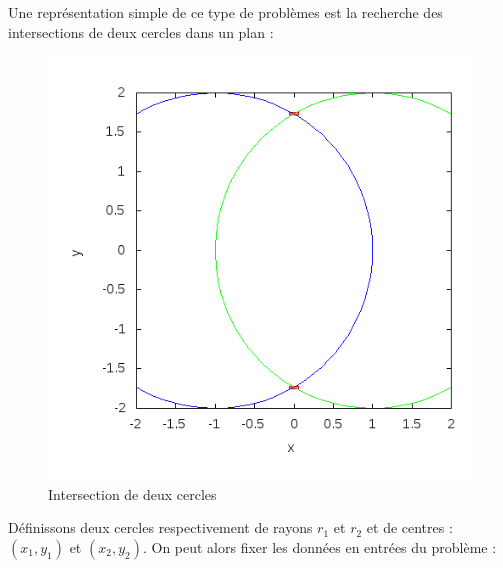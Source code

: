 Une représentation simple de ce type de problèmes est la recherche des intersections de deux cercles dans un plan : 
\begin{figure}[h] %
  \center
\includegraphics[scale=0.55]{img/circle-circle}
  \caption{Intersection de deux cercles} %
 \label{fig:Deuxcerlces} %
\end{figure} %


Définissons deux cercles respectivement de rayons  $r_1$ et $r_2$ et de centres : $(x_1,y_1)$ et $(x_2,y_2)$.
On peut alors fixer les données en entrées du problème :


